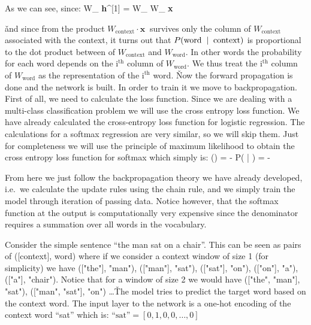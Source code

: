 As we can see, since:
\bse
W_{} \cdot \textbf{h}^{[1]} = W_{} \cdot W_{} \cdot \textbf{x}
\ese

\v

and since from the product $W_{\text{context}} \cdot \textbf{x} \:$ survives only the column of
$W_{\text{context}}$ associated with the context, it turns out that $P (\text{word \:} | \text{\: context})$ is
proportional to the dot product between of $W_{\text{context}}$ and $W_{\text{word}}$. In other words the
probability for each word depends on the $\text{i}^{\text{th}}$ column of $W_{\text{word}}$. We thus treat the
$\text{i}^{\text{th}}$ column of $W_{\text{word}}$ as the representation of the $\text{i}^{\text{th}}$ word. \v

Now the forward propagation is done and the network is built. In order to train it we move to backpropagation. First
of all, we need to calculate the loss function. Since we are dealing with a multi-class classification problem we
will use the cross entropy loss function. We have already calculated the cross-entropy loss function for logistic
regression. The calculations for a softmax regression are very similar, so we will skip them. Just for completeness
we will use the principle of maximum likelihood to obtain the cross entropy loss function for softmax which simply
is:
\bse
{}(\theta) = - \ln P( | ) = - \ln {}
\ese

From here we just follow the backpropagation theory we have already developed, i.e.\ we calculate the update rules
using the chain rule, and we simply train the model through iteration of passing data. Notice however, that the
softmax function at the output is computationally very expensive since the denominator requires a summation over all
words in the vocabulary.

\be
Consider the simple sentence ``the man sat on a chair''. This can be seen as pairs of ([context], word) where if we
consider a context window of size 1 (for simplicity) we have (["the"], "man"), (["man"], "sat"), (["sat"], "on"),
(["on"], "a"), (["a"], "chair"). Notice that for a window of size 2 we would have (["the", "man"], "sat"), (["man",
"sat"], "on") \ldots \v

The model tries to predict the target word based on the context word. The input layer to the network is a one-hot
encoding of the context word ``sat'' which is: $\text{``sat''} = [0,1,0,0, \ldots, 0]$
\ee

